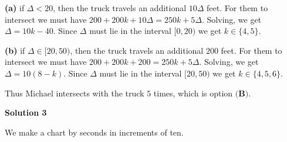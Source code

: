 \begin{enumerate}
 \textbf{(a)} if $\Delta < 20$, then the truck travels an additional $10\Delta$ feet. For them to intersect we must have $200+200k + 10\Delta = 250k + 5\Delta$. Solving, we get $\Delta = 10k - 40$. Since $\Delta$ must lie in the interval $[0,20)$ we get $k \in \{4, 5\}$.

 \textbf{(b)} if $\Delta \in [20, 50)$, then the truck travels an additional $200$ feet. For them to intersect we must have $200+200k + 200 = 250k + 5\Delta$. Solving, we get $\Delta = 10(8-k)$. Since $\Delta$ must lie in the interval $[20,50)$ we get $k \in \{4, 5, 6\}$. 

 Thus Michael intersects with the truck $5$ times, which is option $\boxed{\textbf{(B)}}$.

 



\textbf{Solution 3}

We make a chart by seconds in increments of ten. 


\end{enumerate}
